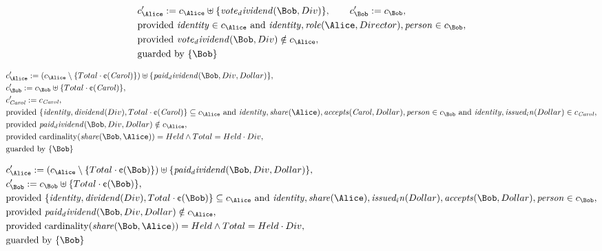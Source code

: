 \begin{align*}
&
c'_
{
\Alice
}
 := 
c_
{
\Alice
}
 \uplus 
\{
\mathit{
vote_dividend
}
(
\Bob
,
Div
)
\}
, \qquad 
c'_
{
\Bob
}
 := 
c_
{
\Bob
}
,\\
&
\text{provided } 
\mathit{
identity
}
 \in c_
{
\Alice
}
 \text{ and } 
\mathit{
identity
}
,
\mathit{
role
}
(
\Alice
,
Director
)
,
\mathit{
person
}
 \in c_
{
\Bob
}
,\\
&
\text{provided } 
\mathit{
vote_dividend
}
(
\Bob
,
Div
)
 \notin c_
{
\Alice
}
,\\
&
\text{guarded by } \{
\Bob
\}
\end{align*}

\begin{align*}
&
c'_
{
\Alice
}
 := 
(c_
{
\Alice
}
 \setminus 
\{
Total
\cdot
\text{\textcent}
(
\mathit{Carol}
)
\}
) \uplus 
\{
\mathit{
paid_dividend
}
(
\Bob
,
Div
,
Dollar
)
\}
,\\
&
c'_
{
\Bob
}
 := 
c_
{
\Bob
}
 \uplus 
\{
Total
\cdot
\text{\textcent}
(
\mathit{Carol}
)
\}
,\\
&
c'_
{
\mathit{Carol}
}
 := 
c_
{
\mathit{Carol}
}
,\\
&
\text{provided } 
\{
\mathit{
identity
}
,
\mathit{
dividend
}
(
Div
)
,
Total
\cdot
\text{\textcent}
(
\mathit{Carol}
)
\}
 \subseteq c_
{
\Alice
}
 \text{ and } 
\mathit{
identity
}
,
\mathit{
share
}
(
\Alice
)
,
\mathit{
accepts
}
(
\mathit{Carol}
,
Dollar
)
,
\mathit{
person
}
 \in c_
{
\Bob
}
 \text{ and } 
\mathit{
identity
}
,
\mathit{
issued_in
}
(
Dollar
)
 \in c_
{
\mathit{Carol}
}
,\\
&
\text{provided } 
\mathit{
paid_dividend
}
(
\Bob
,
Div
,
Dollar
)
 \notin c_
{
\Alice
}
,\\
&
\text{provided } 
\mathrm{cardinality}(
\mathit{
share
}
(
\Bob
,
\Alice
)
)
=
Held
\land
Total
=
Held
\cdot
Div
,\\
&
\text{guarded by } \{
\Bob
\}
\end{align*}

\begin{align*}
&
c'_
{
\Alice
}
 := 
(c_
{
\Alice
}
 \setminus 
\{
Total
\cdot
\text{\textcent}
(
\Bob
)
\}
) \uplus 
\{
\mathit{
paid_dividend
}
(
\Bob
,
Div
,
Dollar
)
\}
,\\
&
c'_
{
\Bob
}
 := 
c_
{
\Bob
}
 \uplus 
\{
Total
\cdot
\text{\textcent}
(
\Bob
)
\}
,\\
&
\text{provided } 
\{
\mathit{
identity
}
,
\mathit{
dividend
}
(
Div
)
,
Total
\cdot
\text{\textcent}
(
\Bob
)
\}
 \subseteq c_
{
\Alice
}
 \text{ and } 
\mathit{
identity
}
,
\mathit{
share
}
(
\Alice
)
,
\mathit{
issued_in
}
(
Dollar
)
,
\mathit{
accepts
}
(
\Bob
,
Dollar
)
,
\mathit{
person
}
 \in c_
{
\Bob
}
,\\
&
\text{provided } 
\mathit{
paid_dividend
}
(
\Bob
,
Div
,
Dollar
)
 \notin c_
{
\Alice
}
,\\
&
\text{provided } 
\mathrm{cardinality}(
\mathit{
share
}
(
\Bob
,
\Alice
)
)
=
Held
\land
Total
=
Held
\cdot
Div
,\\
&
\text{guarded by } \{
\Bob
\}
\end{align*}

